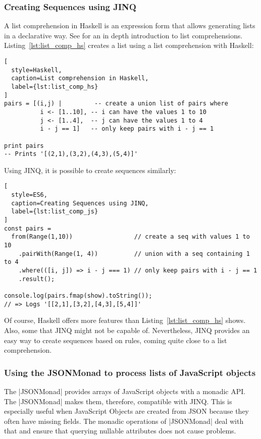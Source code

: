 \subsubsection{Creating Sequences using JINQ} %
\label{sec:Creating Sequences using JINQ}
A list comprehension in Haskell is an expression form that allows generating
lists in a declarative way. See \cite[Chapter 5]{hutton_pih_2016} for an
in depth introduction to list comprehensions. \\
Listing~\ref{lst:list_comp_hs} creates a list using a list comprehension with
Haskell:

\begin{lstlisting}[
  style=Haskell,
  caption=List comprehension in Haskell,
  label={lst:list_comp_hs}
]
pairs = [(i,j) |         -- create a union list of pairs where
          i <- [1..10], -- i can have the values 1 to 10
          j <- [1..4],  -- j can have the values 1 to 4
          i - j == 1]   -- only keep pairs with i - j == 1

print pairs
-- Prints '[(2,1),(3,2),(4,3),(5,4)]'
\end{lstlisting}

Using JINQ, it is possible to create sequences similarly:
\begin{lstlisting}[
  style=ES6,
  caption=Creating Sequences using JINQ,
  label={lst:list_comp_js}
]
const pairs =
  from(Range(1,10))                 // create a seq with values 1 to 10
    .pairWith(Range(1, 4))          // union with a seq containing 1 to 4
    .where(([i, j]) => i - j === 1) // only keep pairs with i - j == 1
    .result();

console.log(pairs.fmap(show).toString());
// => Logs '[[2,1],[3,2],[4,3],[5,4]]'
\end{lstlisting}

Of course, Haskell offers more features than Listing~\ref{lst:list_comp_hs}
shows. Also, some that JINQ might not be capable of. Nevertheless, JINQ
provides an easy way to create sequences based on rules, coming quite close to
a list comprehension.

\subsubsection{Using the JSONMonad to process lists of JavaScript objects} %
\label{sec:Using the JSONMonad to process lists of JavaScript objects}
The |JSONMonad| provides arrays of JavaScript objects with a monadic API. The
|JSONMonad| makes them, therefore, compatible with JINQ. This is especially
useful when JavaScript Objects are created from JSON because they often have
missing fields. The monadic operations of |JSONMonad| deal with that and ensure
that querying nullable attributes does not cause problems.

